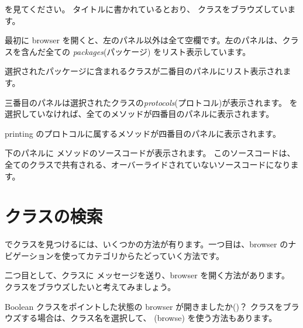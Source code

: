 \documentclass[a4paper,10pt,twoside]{book}
\begin{document}
 を見てください。
タイトルに書かれているとおり、 クラスをブラウズしています。

最初に browser を開くと、左のパネル以外は全て空欄です。左のパネルは、クラスを含んだ全ての \emph{packages}(パッケージ) をリスト表示しています。

選択されたパッケージに含まれるクラスが二番目のパネルにリスト表示されます。

三番目のパネルは選択されたクラスの\emph{protocols}(プロトコル)が表示されます。
 を選択していなければ、全てのメソッドが四番目のパネルに表示されます。

printing のプロトコルに属するメソッドが四番目のパネルに表示されます。

下のパネルに メソッドのソースコードが表示されます。
このソースコードは、全てのクラスで共有される、オーバーライドされていないソースコードになります。

\section{クラスの検索}

\pharo でクラスを見つけるには、いくつかの方法が有ります。一つ目は、browser のナビゲーションを使ってカテゴリからたどっていく方法です。

二つ目として、クラスに  メッセージを送り、browser を開く方法があります。 クラスをブラウズしたいと考えてみましょう。

Boolean クラスをポイントした状態の browser が開きましたか()？
クラスをブラウズする場合は、クラス名を選択して、  (browse) を使う方法もあります。

\end{document}
